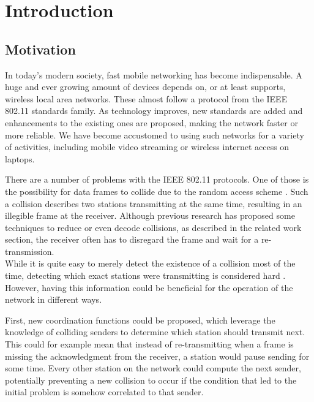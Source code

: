 \chapter{Introduction}\label{ch:introduction}
\glsresetall %



\section{Motivation}

In today's modern society, fast mobile networking has become indispensable. A huge and ever growing amount of devices depends on, or at least supports, wireless local area networks. These almost follow a protocol from the IEEE 802.11 standards family. As technology improves, new standards are added and enhancements to the existing ones are proposed, making the network faster or more reliable. We have become accustomed to using such networks for a variety of activities, including mobile video streaming or wireless internet access on laptops.

There are a number of problems with the \gls{IEEE} 802.11 protocols. One of those is the possibility for data frames to collide due to the random access scheme \cite{bianchi2000}. Such a collision describes two stations transmitting at the same time, resulting in an illegible frame at the receiver. Although previous research has proposed some techniques to reduce or even decode collisions, as described in the related work section, the receiver often has to disregard the frame and wait for a re-transmission.\\

While it is quite easy to merely detect the existence of a collision most of the time, detecting which exact stations were transmitting is considered hard \cite{choi2013, keene2010}. However, having this information could be beneficial for the operation of the network in different ways.

First, new coordination functions could be proposed, which leverage the knowledge of colliding senders to determine which station should transmit next. This could for example mean that instead of re-transmitting when a frame is missing the acknowledgment from the receiver, a station would pause sending for some time. Every other station on the network could compute the next sender, potentially preventing a new collision to occur if the condition that led to the initial problem is somehow correlated to that sender.

